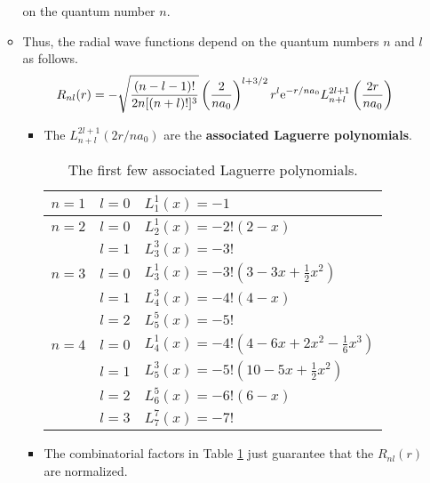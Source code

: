 \documentclass[../notes.tex]{subfiles}
\begin{document}
\begin{itemize}
\begin{itemize}
\begin{equation*}
        \end{equation*}
        on the quantum number $n$.
        \item Thus, the radial wave functions depend on the quantum numbers $n$ and $l$ as follows.
        \begin{equation*}
            R_{nl}(r) = -\sqrt{\frac{(n-l-1)!}{2n[(n+l)!]^3}}\left( \frac{2}{na_0} \right)^{l+3/2}r^l\e[-r/na_0]L_{n+l}^{2l+1}\left( \frac{2r}{na_0} \right)
        \end{equation*}
        \begin{itemize}
            \item The $L_{n+l}^{2l+1}(2r/na_0)$ are the \textbf{associated Laguerre polynomials}.
            \begin{table}[h!]
                \centering
                \small
                \renewcommand{\arraystretch}{1.4}
                \begin{tabular}{lll}
                    \toprule
                    $n=1$ & $l=0$ & $L_1^1(x)=-1$\\
                    \hline
                    $n=2$ & $l=0$ & $L_2^1(x)=-2!(2-x)$\\
                          & $l=1$ & $L_3^3(x)=-3!$\\
                    \hline
                    $n=3$ & $l=0$ & $L_3^1(x)=-3!(3-3x+\frac{1}{2}x^2)$\\
                          & $l=1$ & $L_4^3(x)=-4!(4-x)$\\
                          & $l=2$ & $L_5^5(x)=-5!$\\
                    \hline
                    $n=4$ & $l=0$ & $L_4^1(x)=-4!(4-6x+2x^2-\frac{1}{6}x^3)$\\
                          & $l=1$ & $L_5^3(x)=-5!(10-5x+\frac{1}{2}x^2)$\\
                          & $l=2$ & $L_6^5(x)=-6!(6-x)$\\
                          & $l=3$ & $L_7^7(x)=-7!$\\
                    \bottomrule
                \end{tabular}
                \caption{The first few associated Laguerre polynomials.}
                \label{tab:associatedLaguerrePolynomials}
            \end{table}
            \item The combinatorial factors in Table \ref{tab:associatedLaguerrePolynomials} just guarantee that the $R_{nl}(r)$ are normalized.
        \end{itemize}

\end{itemize}
\end{itemize}
\end{document}
